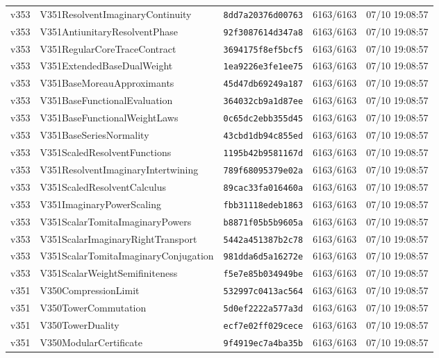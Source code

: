 \documentclass[11pt]{article}
\theoremstyle{definition}\newtheorem{deriv}{Derivação}
\begin{document}
{\begin{longtable}{@{}lllll@{}}
v353 & V351ResolventImaginaryContinuity & \texttt{8dd7a20376d00763} & 6163/6163 & 07/10 19:08:57 \\
v353 & V351AntiunitaryResolventPhase & \texttt{92f3087614d347a8} & 6163/6163 & 07/10 19:08:57 \\
v353 & V351RegularCoreTraceContract & \texttt{3694175f8ef5bcf5} & 6163/6163 & 07/10 19:08:57 \\
v353 & V351ExtendedBaseDualWeight & \texttt{1ea9226e3fe1ee75} & 6163/6163 & 07/10 19:08:57 \\
v353 & V351BaseMoreauApproximants & \texttt{45d47db69249a187} & 6163/6163 & 07/10 19:08:57 \\
v353 & V351BaseFunctionalEvaluation & \texttt{364032cb9a1d87ee} & 6163/6163 & 07/10 19:08:57 \\
v353 & V351BaseFunctionalWeightLaws & \texttt{0c65dc2ebb355d45} & 6163/6163 & 07/10 19:08:57 \\
v353 & V351BaseSeriesNormality & \texttt{43cbd1db94c855ed} & 6163/6163 & 07/10 19:08:57 \\
v353 & V351ScaledResolventFunctions & \texttt{1195b42b9581167d} & 6163/6163 & 07/10 19:08:57 \\
v353 & V351ResolventImaginaryIntertwining & \texttt{789f68095379e02a} & 6163/6163 & 07/10 19:08:57 \\
v353 & V351ScaledResolventCalculus & \texttt{89cac33fa016460a} & 6163/6163 & 07/10 19:08:57 \\
v353 & V351ImaginaryPowerScaling & \texttt{fbb31118edeb1863} & 6163/6163 & 07/10 19:08:57 \\
v353 & V351ScalarTomitaImaginaryPowers & \texttt{b8871f05b5b9605a} & 6163/6163 & 07/10 19:08:57 \\
v353 & V351ScalarImaginaryRightTransport & \texttt{5442a451387b2c78} & 6163/6163 & 07/10 19:08:57 \\
v353 & V351ScalarTomitaImaginaryConjugation & \texttt{981dda6d5a16272e} & 6163/6163 & 07/10 19:08:57 \\
v353 & V351ScalarWeightSemifiniteness & \texttt{f5e7e85b034949be} & 6163/6163 & 07/10 19:08:57 \\
v351 & V350CompressionLimit & \texttt{532997c0413ac564} & 6163/6163 & 07/10 19:08:57 \\
v351 & V350TowerCommutation & \texttt{5d0ef2222a577a3d} & 6163/6163 & 07/10 19:08:57 \\
v351 & V350TowerDuality & \texttt{ecf7e02ff029cece} & 6163/6163 & 07/10 19:08:57 \\
v351 & V350ModularCertificate & \texttt{9f4919ec7a4ba35b} & 6163/6163 & 07/10 19:08:57 \\

\end{longtable}}
\end{document}
